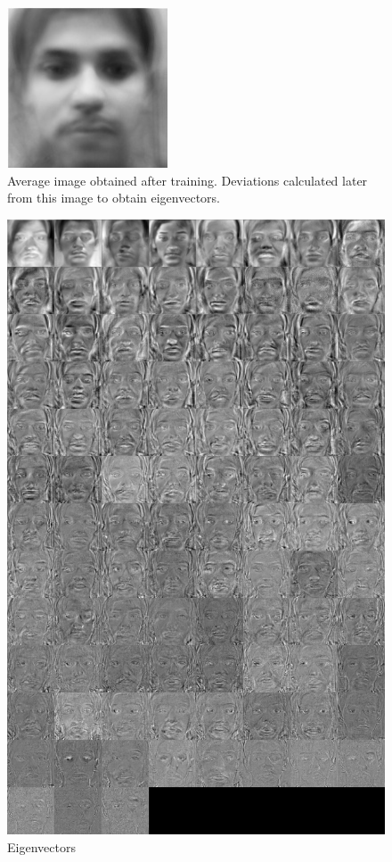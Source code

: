 \documentclass[12pt]{article}			%
\begin{document}
\begin{figure}
	\caption{Average image obtained after training. Deviations calculated later from this image to obtain eigenvectors.}
	\centering
\includegraphics[scale=1]{img/avg_image.jpeg}
\end{figure}

\begin{figure}
	\caption{Eigenvectors}
	\centering
\includegraphics[scale=0.2]{img/eigen.png}
\end{figure}
\end{document}
